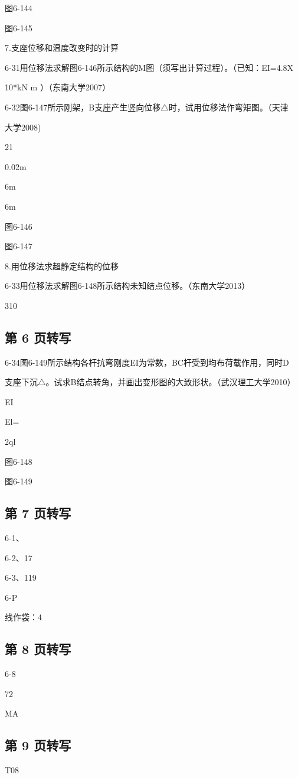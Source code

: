 图6-144

图6-145

7.支座位移和温度改变时的计算

6-31用位移法求解图6-146所示结构的M图（须写出计算过程）。（已知：EI=4.8X

10*kN m ）（东南大学2007）

6-32图6-147所示刚架，B支座产生竖向位移$\triangle$时，试用位移法作弯矩图。（天津

大学2008)

21

0.02m

6m

6m

图6-146

图6-147

8.用位移法求超静定结构的位移

6-33用位移法求解图6-148所示结构未知结点位移。（东南大学2013）

310

\subsection*{第 6 页转写}
6-34图6-149所示结构各杆抗弯刚度EI为常数，BC杆受到均布荷载作用，同时D

支座下沉$\triangle$。试求B结点转角，并画出变形图的大致形状。（武汉理工大学2010）

EI

El=

2ql

图6-148

图6-149

\subsection*{第 7 页转写}
6-1、

6-2、17

6-3、119

6-P

线作袋：4

\subsection*{第 8 页转写}
6-8

72

MA

\subsection*{第 9 页转写}
T08

